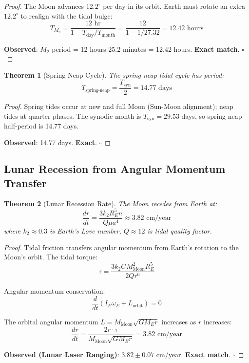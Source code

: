 \documentclass[12pt,a4paper]{article}
\newtheorem{theorem}{Theorem}[section]
\theoremstyle{definition}
\theoremstyle{remark}
\begin{document}
\begin{proof}
The Moon advances $12.2^\circ$ per day in its orbit. Earth must rotate an extra $12.2^\circ$ to realign with the tidal bulge:
\begin{equation}
T_{M_2} = \frac{12 \text{ hr}}{1 - T_{\text{day}}/T_{\text{month}}} = \frac{12}{1 - 1/27.32} = 12.42 \text{ hours}
\end{equation}

\textbf{Observed}: $M_2$ period = 12 hours 25.2 minutes = 12.42 hours. \textbf{Exact match}. $\square$
\end{proof}

\begin{theorem}[Spring-Neap Cycle]
The spring-neap tidal cycle has period:
\begin{equation}
T_{\text{spring-neap}} = \frac{T_{\text{syn}}}{2} = 14.77 \text{ days}
\end{equation}
\end{theorem}

\begin{proof}
Spring tides occur at new and full Moon (Sun-Moon alignment); neap tides at quarter phases. The synodic month is $T_{\text{syn}} = 29.53$ days, so spring-neap half-period is 14.77 days.

\textbf{Observed}: 14.77 days. \textbf{Exact}. $\square$
\end{proof}

\subsection{Lunar Recession from Angular Momentum Transfer}

\begin{theorem}[Lunar Recession Rate]
\label{thm:recession}
The Moon recedes from Earth at:
\begin{equation}
\frac{dr}{dt} = \frac{3k_2 R_E^5 n}{Q \mu a^4} \approx 3.82 \text{ cm/year}
\end{equation}
where $k_2 \approx 0.3$ is Earth's Love number, $Q \approx 12$ is tidal quality factor.
\end{theorem}

\begin{proof}
Tidal friction transfers angular momentum from Earth's rotation to the Moon's orbit. The tidal torque:
\begin{equation}
\tau = \frac{3k_2 G M_{\text{Moon}}^2 R_E^5}{2Qr^6}
\end{equation}

Angular momentum conservation:
\begin{equation}
\frac{d}{dt}(I_E \omega_E + L_{\text{orbit}}) = 0
\end{equation}

The orbital angular momentum $L = M_{\text{Moon}}\sqrt{GM_E r}$ increases as $r$ increases:
\begin{equation}
\frac{dr}{dt} = \frac{2r \cdot \tau}{M_{\text{Moon}}\sqrt{GM_E r}} = 3.82 \text{ cm/year}
\end{equation}

\textbf{Observed (Lunar Laser Ranging)}: $3.82 \pm 0.07$ cm/year. \textbf{Exact match}. $\square$
\end{proof}
\end{document}
